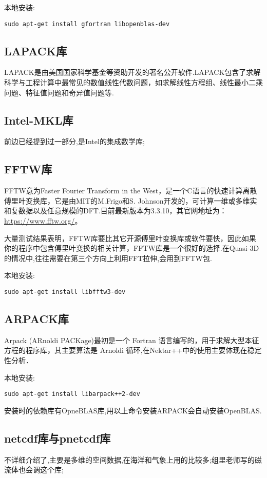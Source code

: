 本地安装:
\begin{lstlisting}[frame=single]
sudo apt-get install gfortran libopenblas-dev
\end{lstlisting}

\subsection{LAPACK库}
LAPACK是由美国国家科学基金等资助开发的著名公开软件.LAPACK包含了求解科学与工程计算中最常见的数值线性代数问题，如求解线性方程组、线性最小二乘问题、特征值问题和奇异值问题等.\par

\subsection{Intel-MKL库}
前边已经提到过一部分,是Intel的集成数学库;


\subsection{FFTW库}
FFTW意为Faster Fourier Transform in the West，是一个C语言的快速计算离散傅里叶变换库，它是由MIT的M.Frigo和S. Johnson开发的，可计算一维或多维实和复数据以及任意规模的DFT.目前最新版本为3.3.10，其官网地址为：\url{https://www.fftw.org/}。

大量测试结果表明，FFTW库要比其它开源傅里叶变换库或软件要快，因此如果你的程序中包含傅里叶变换的相关计算，FFTW库是一个很好的选择.在Quasi-3D的情况中,往往需要在第三个方向上利用FFT拉伸,会用到FFTW包.\par

本地安装:
\begin{lstlisting}[frame=single]
sudo apt-get install libfftw3-dev
\end{lstlisting}


\subsection{ARPACK库}
Arpack (ARnoldi PACKage)最初是一个 Fortran 语言编写的，用于求解大型本征方程的程序库，其主要算法是 Arnoldi 循环,在Nektar++中的使用主要体现在稳定性分析．\par
本地安装:
\begin{lstlisting}[frame=single]
sudo apt-get install libarpack++2-dev
\end{lstlisting}
\par
安装时的依赖库有OpneBLAS库,用以上命令安装ARPACK会自动安装OpenBLAS.

\subsection{netcdf库与pnetcdf库}
不详细介绍了,主要是多维的空间数据,在海洋和气象上用的比较多;组里老师写的磁流体也会调这个库;


